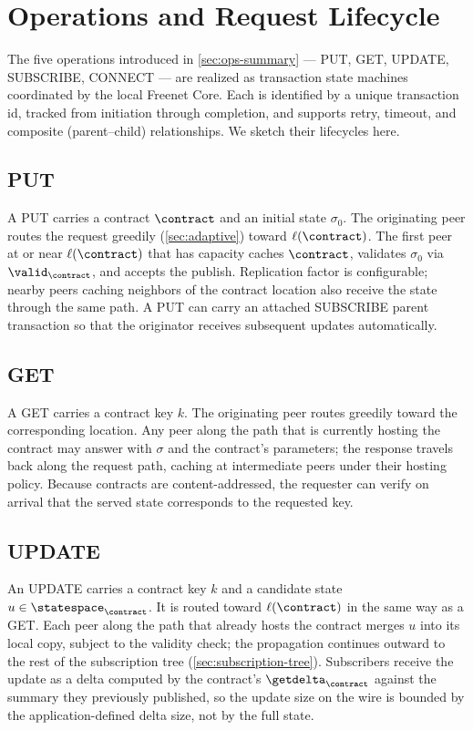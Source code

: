 \section{Operations and Request Lifecycle}
\label{sec:operations}

The five operations introduced in \cref{sec:ops-summary} --- \textsf{PUT}, \textsf{GET}, \textsf{UPDATE}, \textsf{SUBSCRIBE}, \textsf{CONNECT} --- are realized as transaction state machines coordinated by the local Freenet Core. Each is identified by a unique transaction id, tracked from initiation through completion, and supports retry, timeout, and composite (parent--child) relationships. We sketch their lifecycles here.

\subsection{\textsf{PUT}}

A \textsf{PUT} carries a contract $\contract$ and an initial state $\sigma_0$. The originating peer routes the request greedily (\cref{sec:adaptive}) toward $\ell(\contract)$. The first peer at or near $\ell(\contract)$ that has capacity caches $\contract$, validates $\sigma_0$ via $\valid_\contract$, and accepts the publish. Replication factor is configurable; nearby peers caching neighbors of the contract location also receive the state through the same path. A \textsf{PUT} can carry an attached \textsf{SUBSCRIBE} parent transaction so that the originator receives subsequent updates automatically.

\subsection{\textsf{GET}}

A \textsf{GET} carries a contract key $k$. The originating peer routes greedily toward the corresponding location. Any peer along the path that is currently hosting the contract may answer with $\sigma$ and the contract's parameters; the response travels back along the request path, caching at intermediate peers under their hosting policy. Because contracts are content-addressed, the requester can verify on arrival that the served state corresponds to the requested key.

\subsection{\textsf{UPDATE}}

An \textsf{UPDATE} carries a contract key $k$ and a candidate state $u \in \statespace_\contract$. It is routed toward $\ell(\contract)$ in the same way as a \textsf{GET}. Each peer along the path that already hosts the contract merges $u$ into its local copy, subject to the validity check; the propagation continues outward to the rest of the subscription tree (\cref{sec:subscription-tree}). Subscribers receive the update as a delta computed by the contract's $\getdelta_\contract$ against the summary they previously published, so the update size on the wire is bounded by the application-defined delta size, not by the full state.

